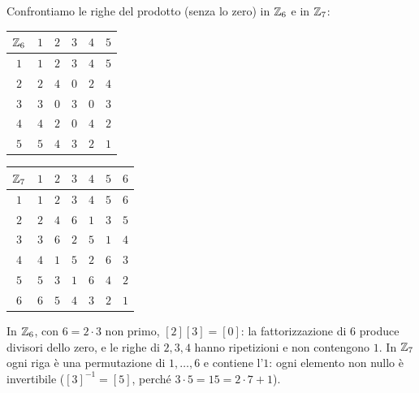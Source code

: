 \begin{spiegazione}
    Confrontiamo le righe del prodotto (senza lo zero) in $\mathbb{Z}_6$ e in $\mathbb{Z}_7$:
    \begin{center}
    \renewcommand{\arraystretch}{1.15}
    \begin{tabular}{c|ccccc}
        $\mathbb{Z}_6$ & $1$ & $2$ & $3$ & $4$ & $5$ \\ \hline
        $1$ & $1$ & $2$ & $3$ & $4$ & $5$ \\
        $2$ & $2$ & $4$ & \cellcolor{cherryred!20}$0$ & $2$ & $4$ \\
        $3$ & $3$ & \cellcolor{cherryred!20}$0$ & $3$ & \cellcolor{cherryred!20}$0$ & $3$ \\
        $4$ & $4$ & $2$ & \cellcolor{cherryred!20}$0$ & $4$ & $2$ \\
        $5$ & $5$ & $4$ & $3$ & $2$ & \cellcolor{seagreen!25}$1$ \\
    \end{tabular}
    \qquad\qquad
    \begin{tabular}{c|cccccc}
        $\mathbb{Z}_7$ & $1$ & $2$ & $3$ & $4$ & $5$ & $6$ \\ \hline
        $1$ & \cellcolor{seagreen!25}$1$ & $2$ & $3$ & $4$ & $5$ & $6$ \\
        $2$ & $2$ & $4$ & $6$ & \cellcolor{seagreen!25}$1$ & $3$ & $5$ \\
        $3$ & $3$ & $6$ & $2$ & $5$ & \cellcolor{seagreen!25}$1$ & $4$ \\
        $4$ & $4$ & \cellcolor{seagreen!25}$1$ & $5$ & $2$ & $6$ & $3$ \\
        $5$ & $5$ & $3$ & \cellcolor{seagreen!25}$1$ & $6$ & $4$ & $2$ \\
        $6$ & $6$ & $5$ & $4$ & $3$ & $2$ & \cellcolor{seagreen!25}$1$ \\
    \end{tabular}
    \end{center}
    In $\mathbb{Z}_6$, con $6 = 2 \cdot 3$ non primo, $[2][3] = [0]$: la fattorizzazione di $6$ produce divisori dello zero, e le righe di $2, 3, 4$ hanno
    ripetizioni e non contengono $1$. In $\mathbb{Z}_7$ ogni riga è una permutazione di $1, \dots, 6$ e contiene l'$1$: ogni elemento non nullo è
    invertibile ($[3]^{-1} = [5]$, perché $3 \cdot 5 = 15 = 2 \cdot 7 + 1$).
\end{spiegazione}

